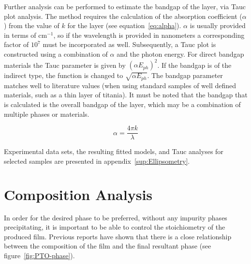 Further analysis can be performed to estimate the bandgap of the layer, via Tauc plot analysis. The method requires the calculation of the absorption coefficient ($\alpha$) from the value of $k$ for the layer (see equation~\vref{eq:alpha}). $\alpha$ is usually provided in terms of cm$^{-1}$, so if the wavelength is provided in nanometers a corresponding factor of $10^{7}$ must be incorporated as well. Subsequently, a Tauc plot is constructed using a combination of $\alpha$ and the photon energy. For direct bandgap materials the Tauc parameter is given by $\left(\alpha E_{ph}\right)^{2}$. If the bandgap is of the indirect type, the function is changed to $\sqrt{\alpha E_{ph}}$. The bandgap parameter matches well to literature values (when using standard samples of well defined materials, such as a thin layer of titania). It must be noted that the bandgap that is calculated is the overall bandgap of the layer, which may be a combination of multiple phases or materials. 

\begin{equation}
	\label{eq:alpha}%
	\alpha = \frac{4\pi k}{\lambda}
\end{equation}

Experimental data sets, the resulting fitted models, and Tauc analyses for selected samples are presented in appendix~\vref{sup:Ellipsometry}.


\section{Composition Analysis}
\label{sec:Methods-Comp}

In order for the desired phase to be preferred, without any impurity phases precipitating, it is important to be able to control the stoichiometry of the produced film. Previous reports have shown that there is a close relationship between the composition of the film and the final resultant phase (see figure~\vref{fig:PTO-phase}).\cite{harjuoja_2006} 

